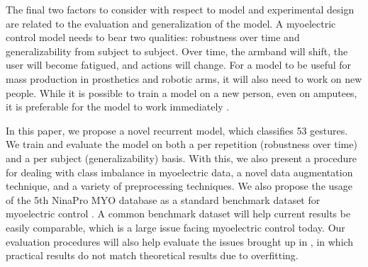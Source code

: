 \documentclass{llncs}
\begin{document}
The final two factors to consider with respect to model and experimental design are related to the evaluation and generalization of the model. A myoelectric control model needs to bear two qualities: robustness over time and generalizability from subject to subject. Over time, the armband will shift, the user will become fatigued, and actions will change. For a model to be useful for mass production in prosthetics and robotic arms, it will also need to work on new people. While it is possible to train a model on a new person, even on amputees, it is preferable for the model to work immediately \cite{amputeedb}.

In this paper, we propose a novel recurrent model, which classifies 53 gestures. We train and evaluate the model on both a per repetition (robustness over time) and a per subject (generalizability) basis. With this, we also present a procedure for dealing with class imbalance in myoelectric data, a novel data augmentation technique, and a variety of preprocessing techniques. We also propose the usage of the 5th NinaPro MYO database as a standard benchmark dataset for myoelectric control \cite{nina5}. A common benchmark dataset will help current results be easily comparable, which is a large issue facing myoelectric control today. Our evaluation procedures will also help evaluate the issues brought up in \cite{systematic}, in which practical results do not match theoretical results due to overfitting.
\end{document}

